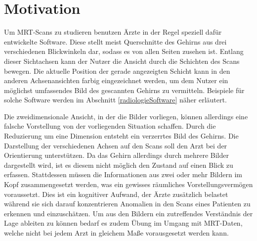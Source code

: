 \section{Motivation}
\label{motivation}

Um MRT-Scans zu studieren benutzen Ärzte in der Regel speziell dafür entwickelte Software. Diese stellt meist Querschnitte des Gehirns aus drei verschiedenen Blickwinkeln dar, sodass es von allen Seiten zusehen ist. Entlang dieser Sichtachsen kann der Nutzer die Ansicht durch die Schichten des Scans bewegen. Die aktuelle Position der gerade angezeigten Schicht kann in den anderen Achsenansichten farbig eingezeichnet werden, um dem Nutzer ein möglichst umfassendes Bild des gescannten Gehirns zu vermitteln. 
Beispiele für solche Software werden im Abschnitt \ref{radiologieSoftware} näher erläutert.

Die zweidimensionale Ansicht, in der die Bilder vorliegen, können allerdings eine falsche Vorstellung von der vorliegenden Situation schaffen. 
Durch die Reduzierung um eine Dimension entsteht ein verzerrtes Bild des Gehirns. Die Darstellung der verschiedenen Achsen auf den Scans soll den Arzt bei der Orientierung unterstützen. Da das Gehirn allerdings durch mehrere Bilder dargestellt wird, ist es diesem nicht möglich den Zustand auf einen Blick zu erfassen. Stattdessen müssen die Informationen aus zwei oder mehr Bildern im Kopf zusammengesetzt werden, was ein gewisses räumliches Vorstellungsvermögen voraussetzt. Dies ist ein kognitiver Aufwand, der Ärzte zusätzlich belastet während sie sich darauf konzentrieren Anomalien in den Scans eines Patienten zu erkennen und einzuschätzen. Um aus den Bildern ein zutreffendes Verständnis der Lage ableiten zu können bedarf es zudem Übung im Umgang mit MRT-Daten, welche nicht bei jedem Arzt in gleichem Maße vorausgesetzt werden kann.

